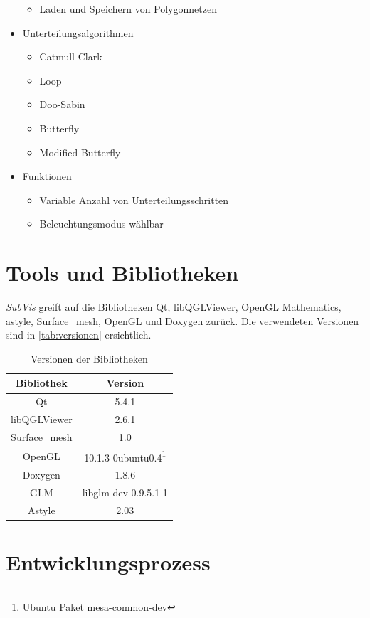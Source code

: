 \begin{itemize}
\begin{itemize}
 	\item Laden und Speichern von Polygonnetzen
 \end{itemize}
 \item Unterteilungsalgorithmen
 \begin{itemize}
 	\item Catmull-Clark
 	\item Loop
 	\item Doo-Sabin
 	\item Butterfly
 	\item Modified Butterfly
 \end{itemize}
 \item Funktionen
 \begin{itemize}
  \item Variable Anzahl von Unterteilungsschritten
  \item Beleuchtungsmodus wählbar

 \end{itemize}
\end{itemize}

\section{Tools und Bibliotheken}

\emph{SubVis} greift auf die Bibliotheken Qt, libQGLViewer, OpenGL Mathematics, astyle, Surface\_mesh, OpenGL und Doxygen zurück.
Die verwendeten Versionen sind in \autoref{tab:versionen} ersichtlich.

\begin{table}[h]
\center
\caption{Versionen der Bibliotheken}
\label{tab:versionen}
\begin{tabular}{c|c}
Bibliothek & Version\\
\hline
Qt & 5.4.1\\
libQGLViewer & 2.6.1\\
Surface\_mesh & 1.0\\
OpenGL & 10.1.3-0ubuntu0.4\footnote{Ubuntu Paket mesa-common-dev}\\
Doxygen & 1.8.6\\
GLM & libglm-dev 0.9.5.1-1\\
Astyle & 2.03\\
\end{tabular}
\end{table}

\section{Entwicklungsprozess}

